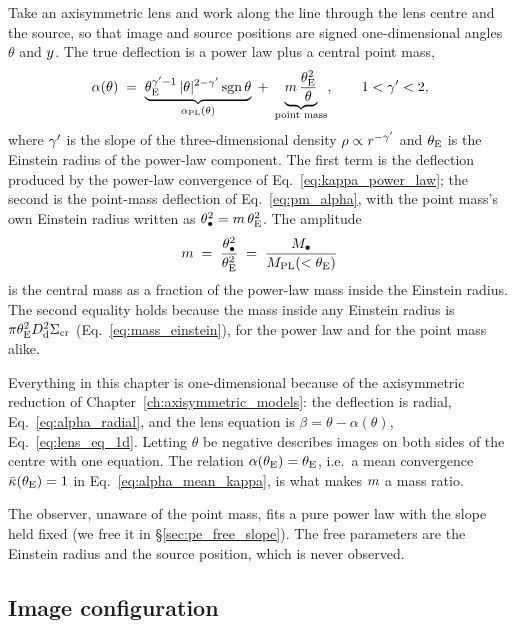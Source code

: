 Take an axisymmetric lens and work along the line through the lens
centre and the source, so that image and source positions are signed
one-dimensional angles $\theta$ and $y$. The true deflection is a
power law plus a central point mass,
\begin{equation}
    \alpha(\theta) \;=\;
    \underbrace{\theta_{\mathrm{E}}^{\gamma'-1}\,|\theta|^{2-\gamma'}\operatorname{sgn}\theta}_{\alpha_{\rm PL}(\theta)}
    \;+\;
    \underbrace{m\,\frac{\theta_{\mathrm{E}}^{2}}{\theta}}_{\text{point mass}} ,
    \qquad 1<\gamma'<2,
    \label{eq:pe_deflection}
\end{equation}
where $\gamma'$ is the slope of the three-dimensional density
$\rho\propto r^{-\gamma'}$ and $\theta_{\mathrm{E}}$ is the Einstein radius of the
power-law component. The first term is the deflection produced by the
power-law convergence of Eq.~\eqref{eq:kappa_power_law}; the second is
the point-mass deflection of Eq.~\eqref{eq:pm_alpha}, with the point
mass's own Einstein radius written as $\theta_{\bullet}^2=m\,\theta_{\mathrm{E}}^2$. The
amplitude
\begin{equation}
    m \;=\; \frac{\theta_{\bullet}^2}{\theta_{\mathrm{E}}^2}
    \;=\; \frac{M_\bullet}{M_{\rm PL}(<\theta_{\mathrm{E}})}
    \label{eq:pe_m_def}
\end{equation}
is the central mass as a fraction of the power-law mass inside the
Einstein radius. The second equality holds because the mass inside any
Einstein radius is $\pi\theta_{\mathrm{E}}^2D_{\mathrm{d}}^2\Sigma_{\mathrm{cr}}$
(Eq.~\eqref{eq:mass_einstein}), for the power law and for the point
mass alike.

\begin{bridge}
Everything in this chapter is one-dimensional because of the
axisymmetric reduction of Chapter~\ref{ch:axisymmetric_models}: the
deflection is radial, Eq.~\eqref{eq:alpha_radial}, and the lens
equation is $\beta=\theta-\alpha(\theta)$, Eq.~\eqref{eq:lens_eq_1d}.
Letting $\theta$ be negative describes images on both sides of the
centre with one equation. The relation $\alpha(\theta_{\mathrm{E}})=\theta_{\mathrm{E}}$, i.e.\
a mean convergence $\bar\kappa(\theta_{\mathrm{E}})=1$ in
Eq.~\eqref{eq:alpha_mean_kappa}, is what makes $m$ a mass ratio.
\end{bridge}

The observer, unaware of the point mass, fits a pure power law
with the slope held fixed (we free it in \S\ref{sec:pe_free_slope}).
The free parameters are the Einstein radius and the source position,
which is never observed.

\subsection{Image configuration}

